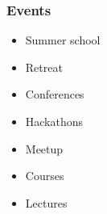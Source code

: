 \begin{frame}\frametitle{Events}

	\begin{itemize}\setlength\itemsep{1em}
		\item Summer school
		\item Retreat
		\item Conferences
		\item Hackathons
		\item Meetup
		\item Courses
		\item Lectures
	\end{itemize}\vspace{0.3cm}

\end{frame}
